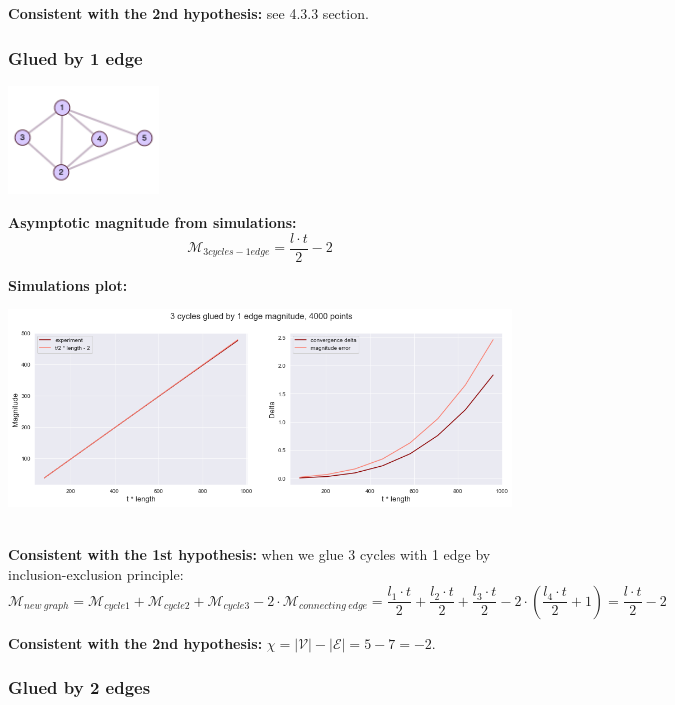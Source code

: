 \documentclass{article}
\begin{document}
\textbf{Consistent with the 2nd hypothesis:} see 4.3.3 section.

\subsubsection{Glued by 1 edge}

\begin{center}
\includegraphics[width=0.3\textwidth]{3cicles_e_exp} \\ 
\end{center}

\textbf{Asymptotic magnitude from simulations:}
\\

$$\mathcal{M}_{3cycles-1edge} = \frac{l \cdot t}{2} - 2$$

\textbf{Simulations plot:}
\begin{center}
\includegraphics[width=\textwidth]{3cycles1edge_plot} \ \ \ \ \
\end{center}

\textbf{Consistent with the 1st hypothesis:} when we glue 3 cycles with 1 edge by inclusion-exclusion
principle: $$\mathcal{M}_{new \ graph} = \mathcal{M}_{cycle1} + \mathcal{M}_{cycle2} + \mathcal{M}_{cycle3}
- 2 \cdot \mathcal{M}_{connecting \ edge} = \frac{l_1 \cdot t}{2} + \frac{l_2 \cdot t}{2} + \frac{l_3 \cdot t}{2} - 2 \cdot (\frac{l_4 \cdot t}{2} + 1)
= \frac{l \cdot t}{2} - 2$$ 

\textbf{Consistent with the 2nd hypothesis:} $\chi = |\mathcal{V}| - |\mathcal{E}| = 5 - 7 = -2$.


\subsubsection{Glued by 2 edges}
\end{document}
